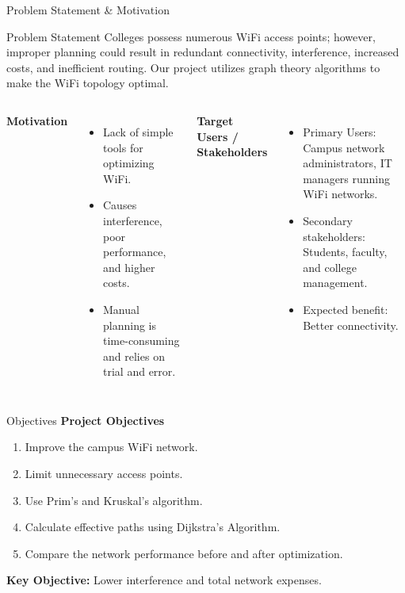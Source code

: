 \documentclass[aspectratio=169,11pt]{beamer}
\begin{document}
\begin{frame}{Problem Statement \& Motivation}
\begin{block}{Problem Statement}
Colleges possess numerous WiFi access points; however, improper planning could result in redundant connectivity, interference, increased costs, and inefficient routing. Our project utilizes graph theory algorithms to make the WiFi topology optimal.
\end{block}

\vspace{1mm}
\begin{columns}[T,totalwidth=\textwidth]
\scriptsize
\textbf{\color{GEUBlue}Motivation}
\begin{itemize}\itemsep2pt
\item Lack of simple tools for optimizing WiFi.
\item Causes interference, poor performance, and higher costs.
\item Manual planning is time-consuming and relies on trial and error.
\end{itemize}

\scriptsize
\textbf{\color{GEUBlue}Target Users / Stakeholders}
\begin{itemize}\itemsep2pt
\item Primary Users: Campus network administrators, IT managers running WiFi networks.
\item Secondary stakeholders: Students, faculty, and college management.
\item Expected benefit: Better connectivity.
\end{itemize}
\end{columns}
\end{frame}

\begin{frame}{Objectives}
\textbf{\color{GEUBlue}Project Objectives}
\vspace{2mm}
\begin{enumerate}\itemsep5pt
\item Improve the campus WiFi network.
\item Limit unnecessary access points.
\item Use Prim's and Kruskal's algorithm.
\item Calculate effective paths using Dijkstra's Algorithm.
\item Compare the network performance before and after optimization.
\end{enumerate}

\vfill
\begin{center}
\colorbox{GEULightBlue}{\parbox{.80\textwidth}{\centering
\textbf{Key Objective:} Lower interference and total network expenses.}}
\end{center}
\end{frame}
\end{document}
